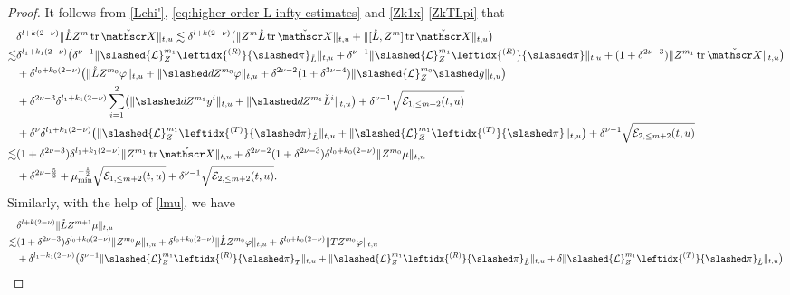 \documentclass[11pt,twoside]{article}
\def\f{\frac}
\begin{document}
\begin{proof}
It follows from \eqref{Lchi'}, \eqref{eq:higher-order-L-infty-estimates} and \eqref{Zk1x}-\eqref{ZkTLpi} that
\begin{align}
&\delta^{l+k(2-\nu)}\|\mathring LZ^m\operatorname{tr}{\check{\mathscr X}}\|_{t,u}\lesssim\delta^{l+k(2-\nu)}\bigl(\|Z^m\mathring L\operatorname{tr}{\check{\mathscr X}}\|_{t,u}+\|[\mathring L,Z^m]\operatorname{tr}{\check{\mathscr X}}\|_{t,u}\bigr)\nonumber\\
\lesssim&\delta^{l_1+k_1(2-\nu)}\bigl(\delta^{\nu-1}\|\slashed{\mathcal L}_Z^{m_1}\leftidx{^{(R)}}{\slashed\pi}_{\mathring L}\|_{t,u}+\delta^{\nu-1}\|\slashed{\mathcal L}_Z^{m_1}\leftidx{^{(R)}}{\slashed\pi}\|_{t,u}+(1+\delta^{2\nu-3})\|Z^{m_1}\operatorname{tr}{\check{\mathscr X}}\|_{t,u}\bigr)\nonumber\\
&+\delta^{l_0+k_0(2-\nu)}\bigl(\|\mathring LZ^{m_0}\varphi\|_{t,u}+\|\slashed dZ^{m_0}\varphi\|_{t,u}+\delta^{2\nu-2}(1+\delta^{3\nu-4})\|\slashed{\mathcal L}_Z^{m_0}\slashed g\|_{t,u}\bigr)\nonumber\\
&+\delta^{2\nu-3}\delta^{l_1+k_1(2-\nu)}\sum_{i=1}^2\bigl(\|\slashed dZ^{m_1}y^i\|_{t,u}+\|\slashed dZ^{m_1}\check L^i\|_{t,u}\bigr)+\delta^{\nu-1}\sqrt{\mathcal{E}_{1,\leq m+2}(t,u)}\nonumber\\
&+\delta^{\nu}\delta^{l_1+k_1(2-\nu)}\bigl(\|\slashed{\mathcal L}_Z^{m_1}\leftidx{^{(T)}}{\slashed\pi}_{\mathring L}\|_{t,u}+\|\slashed{\mathcal L}_Z^{m_1}\leftidx{^{(T)}}{\slashed\pi}\|_{t,u}\bigr)+\delta^{\nu-1}\sqrt{\mathcal{E}_{2,\leq m+2}(t,u)}\nonumber\\
\lesssim&(1+\delta^{2\nu-3})\delta^{l_1+k_1(2-\nu)}\|Z^{m_1}\operatorname{tr}{\check{\mathscr X}}\|_{t,u}+\delta^{2\nu-2}(1+\delta^{2\nu-3})\delta^{l_0+k_0(2-\nu)} \| Z^{m_0}\mu \|_{t,u}\label{LX}\\
&+\delta^{2\nu-\f52}+\mu_{\min}^{-\f12}\sqrt{\mathcal{E}_{1,\leq m+2}(t,u)}+\delta^{\nu-1}\sqrt{\mathcal{E}_{2,\leq m+2}(t,u)}.\nonumber
\end{align}
Similarly, with the help of \eqref{lmu}, we have
\begin{align}
&\delta^{l+k(2-\nu)}\|\mathring LZ^{m+1}\mu\|_{t,u}\nonumber\\
\lesssim&(1+\delta^{2\nu-3})\delta^{l_0+k_0(2-\nu)}\|Z^{m_0}\mu\|_{t,u}+\delta^{l_0+k_0(2-\nu)}\|\mathring LZ^{m_0}\varphi\|_{t,u}+\delta^{l_0+k_0(2-\nu)}\|TZ^{m_0}\varphi\|_{t,u}\nonumber\\
&+\delta^{l_1+k_1(2-\nu)}\bigl(\delta^{\nu-1}\|\slashed{\mathcal L}_Z^{m_1}\leftidx{^{(R)}}{\slashed\pi}_{T}\|_{t,u}+\|\slashed{\mathcal L}_Z^{m_1}\leftidx{^{(R)}}{\slashed\pi}_{\mathring L}\|_{t,u}+\delta\|\slashed{\mathcal L}_Z^{m_1}\leftidx{^{(T)}}{\slashed\pi}_{\mathring L}\|_{t,u}\bigr)\nonumber\\

\end{align}
\end{proof}
\end{document}
